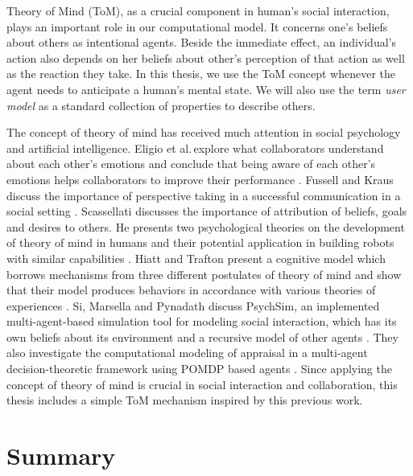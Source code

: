\documentclass[12pt]{report}
\begin{document}
Theory of Mind (ToM), as a crucial component in human's social interaction,
plays an important role in our computational model. It concerns one's beliefs
about others as intentional agents. Beside the immediate effect, an individual's
action also depends on her beliefs about other's perception of that action as
well as the reaction they take. In this thesis, we use the ToM concept whenever
the agent needs to anticipate a human's mental state. We will also use the
term \textit{user model} as a standard collection of properties to describe
others.

The concept of theory of mind has received much attention in social psychology
and artificial intelligence. Eligio et al.\,explore what collaborators
understand about each other's emotions and conclude that being aware of each
other's emotions helps collaborators to improve their performance
\cite{eligio:emotion-understanding-collaboration}. Fussell and Kraus discuss the
importance of perspective taking in a successful communication in a social
setting \cite{fussell:knowledge-coordination-communication}. Scassellati
discusses the importance of attribution of beliefs, goals and desires to others.
He presents two psychological theories on the development of theory of mind in
humans and their potential application in building robots with similar
capabilities \cite{scassellati:tom-humanoid-robot}. Hiatt and Trafton present a
cognitive model which borrows mechanisms from three different postulates of
theory of mind and show that their model produces behaviors in accordance with
various theories of experiences \cite{hiatt:cognitive-model-tom}. Si, Marsella
and Pynadath discuss PsychSim, an implemented multi-agent-based simulation tool
for modeling social interaction, which has its own beliefs about its environment
and a recursive model of other agents \cite{pynadath:modeling-tom-appraisal}.
They also investigate the computational modeling of appraisal in a multi-agent
decision-theoretic framework using POMDP based agents
\cite{si:modeling-appraisal-tom, si:modeling-appraisal-tom-journal}. Since
applying the concept of theory of mind is crucial in social interaction and
collaboration, this thesis includes a simple ToM mechanism inspired by this
previous work.

\section{Summary}
\end{document}
